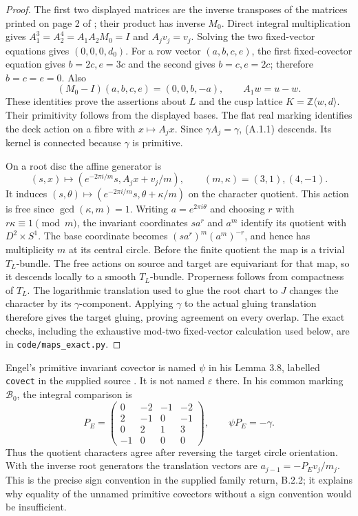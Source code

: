 \begin{proof}
The first two displayed matrices are the inverse transposes of
the matrices printed on page 2 of \cite{mapsAC26}; their product
has inverse $M_0$.  Direct integral multiplication gives
$A_1^3=A_2^4=A_1A_2M_0=I$ and $A_jv_j=v_j$.
Solving the two fixed-vector equations gives $(0,0,0,d_0)$.
For a row vector $(a,b,c,e)$, the first fixed-covector equation
gives $b=2c,e=3c$ and the second gives $b=c,e=2c$;
therefore $b=c=e=0$.  Also
\[
 (M_0-I)(a,b,c,e)=(0,0,b,-a),\qquad
 A_1w=u-w.
\]
These identities prove the assertions about $L$ and the cusp
lattice $K=\mathbb Z\langle w,d\rangle$.  Their primitivity follows
from the displayed bases.  The flat real marking identifies the
deck action on a fibre with $x\mapsto A_jx$.  Since
$\gamma A_j=\gamma$, (A.1.1) descends.  Its kernel is connected
because $\gamma$ is primitive.

On a root disc the affine generator is
\[
 (s,x)\longmapsto
 (e^{-2\pi i/m}s,A_jx+v_j/m),\qquad (m,\kappa)=(3,1),(4,-1).
\]
It induces $(s,\theta)\mapsto
(e^{-2\pi i/m}s,\theta+\kappa/m)$ on the character quotient.
This action is free since $\gcd(\kappa,m)=1$.  Writing
$a=e^{2\pi i\theta}$ and choosing $r$ with $r\kappa\equiv1\pmod m$,
the invariant coordinates $s a^r$ and $a^m$ identify its quotient
with $D^2\times S^1$.  The base coordinate becomes
$(s a^r)^m(a^m)^{-r}$, and hence has multiplicity $m$ at its
central circle.  Before the finite quotient the map is a trivial
$T_L$-bundle.  The free actions on source and target are
equivariant for that map, so it descends locally to a smooth
$T_L$-bundle.  Properness follows from compactness of $T_L$.
The logarithmic translation used to glue the root chart to $J$
changes the character by its $\gamma$-component.  Applying
$\gamma$ to the actual gluing translation therefore gives the
target gluing, proving agreement on every overlap.
The exact checks, including the exhaustive mod-two fixed-vector
calculation used below, are in \texttt{code/maps\_exact.py}.
\end{proof}

Engel's primitive invariant covector is named $\psi$ in his
Lemma 3.8, labelled \texttt{covect} in the supplied source
\cite{mapsEngel}.  It is not named $\varepsilon$ there.  In his
common marking $\mathcal B_0$, the integral comparison is
\[
 P_E=\begin{pmatrix}0&-2&-1&-2\\2&-1&0&-1\\0&2&1&3\\-1&0&0&0\end{pmatrix},
 \qquad \psi P_E=-\gamma.
 \tag{A.1.2}
\]
Thus the quotient characters agree after reversing the target
circle orientation.  With the inverse root generators the
translation vectors are $a_{j-1}=-P_Ev_j/m_j$.
This is the precise sign convention in the supplied family
return, B.2.2; it explains why equality of the unnamed primitive
covectors without a sign convention would be insufficient.

